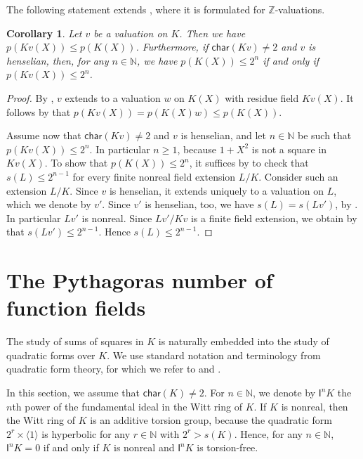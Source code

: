 \documentclass[12pt,leqno]{amsart}
\newcommand{\la}{\langle}
\newcommand{\ra}{\rangle}
\newcommand{\nat}{\mathbb{N}}
\newcommand{\zz}{\mathbb Z}
\newcommand{\car}{\mathsf{char}}
\renewcommand{\leq}{\leqslant}
\renewcommand{\geq}{\geqslant}
\newcommand{\I}{\mathsf{I}}
\numberwithin{equation}{section}
\newtheorem{cor}[equation]{Corollary}
\theoremstyle{definition}
\theoremstyle{plain}
\begin{document}
The following statement extends \cite[Theorem 4.14]{BGVG14}, where it is formulated for $\zz$-valuations.

\begin{cor}\label{C:rff1var-2powbound}
    Let $v$ be a valuation on $K$.
    Then we have $p(Kv(X))\leq p(K(X))$.
    Furthermore, if $\car(Kv)\neq 2$ and $v$ is henselian, then, for any $n\in\nat$, we have $p(K(X))\leq 2^n$ if and only if $p(Kv(X))\leq 2^n$.
     
\end{cor}
\begin{proof}
By \cite[Cor.~2.2.2]{EP05}, $v$ extends to a valuation $w$ on $K(X)$ with residue field $Kv(X)$.
It follows by  that $p(Kv(X))= p(K(X)w)\leq p(K(X))$.

Assume now that $\car(Kv)\neq 2$ and $v$ is henselian, and let $n\in\nat$ be such that $p(Kv(X))\leq 2^n$. 
In particular $n\geq 1$, because $1+X^2$ is not a square in $Kv(X)$.
To show that $p(K(X))\leq 2^n$, it suffices by  to check that $s(L)\leq 2^{n-1}$ for every finite nonreal field extension $L/K$.
Consider such an extension $L/K$.
Since $v$ is henselian, it extends uniquely to a valuation on $L$, which we denote by $v'$.
Since $v'$ is henselian, too, we have $s(L)=s(Lv')$, by . In particular $Lv'$ is nonreal. 
Since $Lv'/Kv$ is a finite field extension, we obtain by  that $s(Lv')\leq 2^{n-1}$. Hence $s(L)\leq 2^{n-1}$.
\end{proof}

\section{The Pythagoras number of function fields} %
\label{S:cd2}

The study of sums of squares in $K$ is naturally embedded into the study of quadratic forms over $K$.
We use standard notation and terminology from quadratic form theory, for which we refer to \cite{Lam05} and \cite{EKM08}.

In this section, we assume that $\car(K)\neq 2$.
For $n\in\nat$, we denote by $\I^n K$ the $n$th power of the fundamental ideal in the Witt ring of $K$.
If $K$ is nonreal, then the Witt ring of $K$ is an additive torsion group, because the quadratic form $2^r\times \la 1\ra$ is hyperbolic for any $r\in\nat$ with $2^r>s(K)$.
Hence, for any $n\in\nat$, $\I^n K=0$ if and only if $K$ is nonreal and $\I^n K$ is torsion-free.
\end{document}
